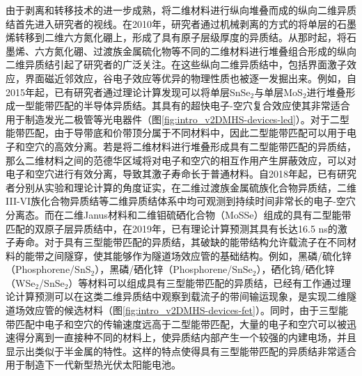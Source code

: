     由于剥离和转移技术的进一步成熟，将二维材料进行纵向堆叠而成的纵向二维异质结首先进入研究者的视线。在2010年，研究者通过机械剥离的方式的将单层的石墨烯转移到二维六方氮化硼上，形成了具有原子层级厚度的异质结。从那时起，将石墨烯、六方氮化硼、过渡族金属硫化物等不同的二维材料进行堆叠组合形成的纵向二维异质结引起了研究者的广泛关注。在这些纵向二维异质结中，包括界面激子效应，界面磁近邻效应，谷电子效应等优异的物理性质也被逐一发掘出来。例如，自2015年起，已有研究者通过理论计算发现可以将单层SnSe$_2$与单层MoS$_2$进行堆叠形成一型能带匹配的半导体异质结。其具有的超快电子-空穴复合效应使其非常适合用于制造发光二极管等光电器件（图\ref{fig:intro_v2DMHS-devices-led}）。对于二型能带匹配，由于导带底和价带顶分属于不同材料中，因此二型能带匹配可以用于电子和空穴的高效分离。若是将二维材料进行堆叠形成具有二型能带匹配的异质结，那么二维材料之间的范德华区域将对电子和空穴的相互作用产生屏蔽效应，可以对电子和空穴进行有效分离，导致其激子寿命长于普通材料。自2018年起，已有研究者分别从实验和理论计算的角度证实，在二维过渡族金属硫族化合物异质结，二维III-VI族化合物异质结等二维异质结体系中均可观测到持续时间非常长的电子-空穴分离态。而在二维Janus材料和二维钼硫硒化合物（MoSSe）组成的具有二型能带匹配的双原子层异质结中，在2019年，已有理论计算预测其具有长达16.5 ns的激子寿命。对于具有三型能带匹配的异质结，其破缺的能带结构允许载流子在不同材料的能带之间隧穿，使其能够作为隧道场效应管的基础结构。例如，黑磷/硫化锌（Phosphorene/SnS$_2$），黑磷/硒化锌（Phosphorene/SnSe$_2$），硒化钨/硒化锌（WSe$_2$/SnSe$_2$）等材料可以组成具有三型能带匹配的异质结，已经有工作通过理论计算预测可以在这类二维异质结中观察到载流子的带间输运现象，是实现二维隧道场效应管的候选材料（图\ref{fig:intro_v2DMHS-devices-fet}）。同时，由于三型能带匹配中电子和空穴的传输速度远高于二型能带匹配，大量的电子和空穴可以被迅速得分离到一直接种不同的材料上，使异质结内部产生一个较强的内建电场，并且显示出类似于半金属的特性。这样的特点使得具有三型能带匹配的异质结非常适合用于制造下一代新型热光伏太阳能电池。

